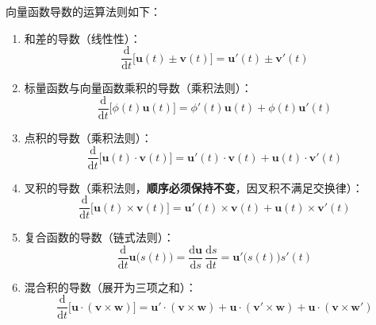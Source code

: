 \begin{theorem}[向量函数的求导法则]
	向量函数导数的运算法则如下：
	\begin{enumerate}
		\item 和差的导数（线性性）：
		\begin{equation}
			\frac{\mathrm{d}}{\mathrm{d}t}\bigl[\boldsymbol{u}(t)\pm\boldsymbol{v}(t)\bigr]
			=\boldsymbol{u}'(t)\pm\boldsymbol{v}'(t)
			\label{eq:向量函数:和差导数}
		\end{equation}
		\item 标量函数与向量函数乘积的导数（乘积法则）：
		\begin{equation}
			\frac{\mathrm{d}}{\mathrm{d}t}\bigl[\phi(t)\boldsymbol{u}(t)\bigr]
			=\phi'(t)\boldsymbol{u}(t)+\phi(t)\boldsymbol{u}'(t)
			\label{eq:向量函数:数乘导数}
		\end{equation}
		\item 点积的导数（乘积法则）：
		\begin{equation}
			\frac{\mathrm{d}}{\mathrm{d}t}\bigl[\boldsymbol{u}(t)\cdot\boldsymbol{v}(t)\bigr]
			=\boldsymbol{u}'(t)\cdot\boldsymbol{v}(t)+\boldsymbol{u}(t)\cdot\boldsymbol{v}'(t)
			\label{eq:向量函数:点积导数}
		\end{equation}
		\item 叉积的导数（乘积法则，\textbf{顺序必须保持不变}，因叉积不满足交换律）：
		\begin{equation}
			\frac{\mathrm{d}}{\mathrm{d}t}\bigl[\boldsymbol{u}(t)\times\boldsymbol{v}(t)\bigr]
			=\boldsymbol{u}'(t)\times\boldsymbol{v}(t)+\boldsymbol{u}(t)\times\boldsymbol{v}'(t)
			\label{eq:向量函数:叉积导数}
		\end{equation}
		\item 复合函数的导数（链式法则）：
		\begin{equation}
			\frac{\mathrm{d}}{\mathrm{d}t}\boldsymbol{u}\bigl(s(t)\bigr)
			=\frac{\mathrm{d}\boldsymbol{u}}{\mathrm{d}s}\,\frac{\mathrm{d}s}{\mathrm{d}t}
			=\boldsymbol{u}'\bigl(s(t)\bigr)s'(t)
			\label{eq:向量函数:链式法则}
		\end{equation}
		\item 混合积的导数（展开为三项之和）：
		\begin{equation}
			\frac{\mathrm{d}}{\mathrm{d}t}\bigl[\boldsymbol{u}\cdot(\boldsymbol{v}\times\boldsymbol{w})\bigr]
			=\boldsymbol{u}'\cdot(\boldsymbol{v}\times\boldsymbol{w})
			+\boldsymbol{u}\cdot(\boldsymbol{v}'\times\boldsymbol{w})
			+\boldsymbol{u}\cdot(\boldsymbol{v}\times\boldsymbol{w}')
			\label{eq:向量函数:混合积导数}
		\end{equation}
	\end{enumerate}
\end{theorem}

